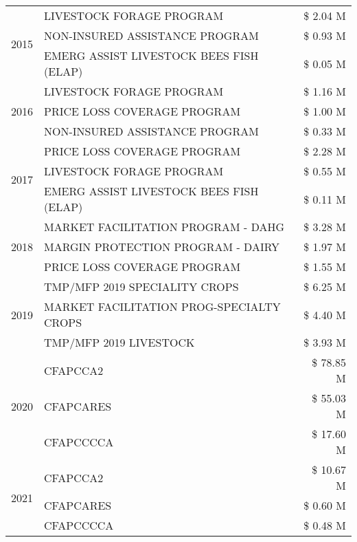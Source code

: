 \begin{tabular}{llr}
\multirow[t]{3}{*}{2015} & LIVESTOCK FORAGE PROGRAM & \$ 2.04 M \\
 & NON-INSURED ASSISTANCE PROGRAM & \$ 0.93 M \\
 & EMERG ASSIST LIVESTOCK BEES FISH (ELAP) & \$ 0.05 M \\
\cline{1-3}
\multirow[t]{3}{*}{2016} & LIVESTOCK FORAGE PROGRAM                      & \$ 1.16 M \\
 & PRICE LOSS COVERAGE PROGRAM                   & \$ 1.00 M \\
 & NON-INSURED ASSISTANCE PROGRAM                & \$ 0.33 M \\
\cline{1-3}
\multirow[t]{3}{*}{2017} & PRICE LOSS COVERAGE PROGRAM & \$ 2.28 M \\
 & LIVESTOCK FORAGE PROGRAM & \$ 0.55 M \\
 & EMERG ASSIST LIVESTOCK BEES FISH (ELAP) & \$ 0.11 M \\
\cline{1-3}
\multirow[t]{3}{*}{2018} & MARKET FACILITATION PROGRAM - DAHG & \$ 3.28 M \\
 & MARGIN PROTECTION PROGRAM - DAIRY & \$ 1.97 M \\
 & PRICE LOSS COVERAGE PROGRAM & \$ 1.55 M \\
\cline{1-3}
\multirow[t]{3}{*}{2019} & TMP/MFP 2019 SPECIALITY CROPS & \$ 6.25 M \\
 & MARKET FACILITATION PROG-SPECIALTY CROPS & \$ 4.40 M \\
 & TMP/MFP 2019 LIVESTOCK & \$ 3.93 M \\
\cline{1-3}
\multirow[t]{3}{*}{2020} & CFAPCCA2 & \$ 78.85 M \\
 & CFAPCARES & \$ 55.03 M \\
 & CFAPCCCCA & \$ 17.60 M \\
\cline{1-3}
\multirow[t]{3}{*}{2021} & CFAPCCA2 & \$ 10.67 M \\
 & CFAPCARES & \$ 0.60 M \\
 & CFAPCCCCA & \$ 0.48 M \\
\cline{1-3}
\bottomrule
\end{tabular}
